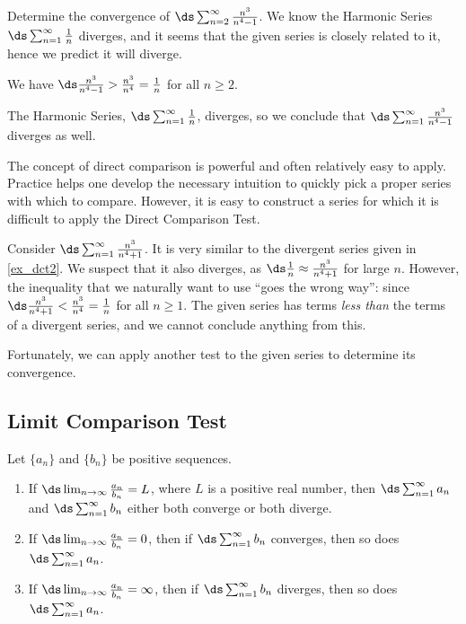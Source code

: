 \begin{example}\label{ex_dct2}%
Determine the convergence of $\ds\sum_{n=2}^\infty \frac{n^3}{n^4-1}$.
\solution
We know the Harmonic Series $\ds\sum_{n=1}^\infty \frac1n$ diverges, and it seems that the given series is closely related to it, hence we predict it will diverge. 

We have $\ds \frac{n^3}{n^4-1}>\frac{n^3}{n^4}=\frac{1}{n}$ for all $n\geq 2$. 

The Harmonic Series, $\ds\sum_{n=1}^\infty \frac{1}{n}$,  diverges, so we conclude that $\ds\sum_{n=1}^\infty \frac{n^3}{n^4-1}$ diverges as well.
\end{example}

The concept of direct comparison is powerful and often relatively easy to apply. Practice helps one develop the necessary intuition to quickly pick a proper series with which to compare. However, it is easy to construct a series for which it is difficult to apply the Direct Comparison Test. 

Consider $\ds\sum_{n=1}^\infty \frac{n^3}{n^4+1}$. It is very similar to the divergent series given in \autoref{ex_dct2}. We suspect that it also diverges, as $\ds \frac 1n \approx \frac{n^3}{n^4+1}$ for large $n$. However, the inequality that we naturally want to use ``goes the wrong way'': since  $\ds \frac{n^3}{n^4+1}<\frac{n^3}{n^4}=\frac{1}{n}$ for all $n\geq 1$. The given series has terms \emph{less than} the terms of a divergent series, and we cannot conclude anything from this.

Fortunately, we can apply another test to the given series to determine its convergence.

\subsection{Limit Comparison Test}

\begin{theorem}\label{thm:series_limit_compare}%
Let $\{a_n\}$ and $\{b_n\}$ be positive sequences.
\begin{enumerate}
	\item If $\ds\lim_{n\to\infty} \frac{a_n}{b_n} = L$, where $L$ is a positive real number, then $\ds \sum_{n=1}^\infty a_n$ and $\ds \sum_{n=1}^\infty b_n$ either both converge or both diverge.
	\item	If $\ds\lim_{n\to\infty} \frac{a_n}{b_n} = 0$, then if $\ds \sum_{n=1}^\infty b_n$ converges, then so does $\ds \sum_{n=1}^\infty a_n$.
	\item	If $\ds\lim_{n\to\infty} \frac{a_n}{b_n} = \infty$, then if $\ds \sum_{n=1}^\infty b_n$ diverges, then so does $\ds \sum_{n=1}^\infty a_n$.
\end{enumerate}
\end{theorem}

